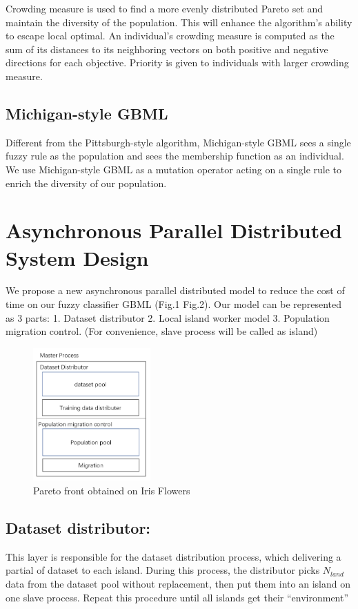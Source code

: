 \documentclass[conference]{IEEEtran}
\begin{document}
	 Crowding measure is used to find a more evenly distributed Pareto set and maintain the diversity of the population. This will enhance the algorithm's ability to escape local optimal. An individual's crowding measure is computed as the sum of its distances to its neighboring vectors on both positive and negative directions for each objective. Priority is given to individuals with larger crowding measure.
	 
	 \subsection{Michigan-style GBML}
	 
	 Different from the Pittsburgh-style algorithm, Michigan-style GBML sees a single fuzzy rule as the population and sees the membership function as an individual. We use Michigan-style GBML as a mutation operator acting on a single rule to enrich the diversity of our population. 
   
  
   
  \section{Asynchronous Parallel Distributed System Design}
  We propose a new asynchronous parallel distributed model to reduce the cost of time on our fuzzy classifier GBML (Fig.1 Fig.2). Our model can be represented as 3 parts: 1. Dataset distributor 2. Local island worker model 3. Population migration control. (For convenience, slave process will be called as island)


 \begin{figure}[H]
 	\centering
 	\includegraphics[width=0.4\textwidth]{figures/master.png}
 	\caption{Pareto front obtained on Iris Flowers}\label{fig:digit}
 \end{figure}

	\subsection{Dataset distributor:}
	This layer is responsible for the dataset distribution process, which delivering a partial of dataset to each island. During this process, the distributor picks $N_{land}$ data from the dataset pool without replacement, then put them into an island on one slave process. Repeat this procedure until all islands get their “environment”
\end{document}

